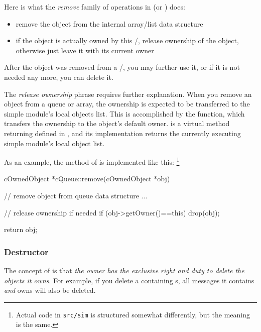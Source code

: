 Here is what the \textit{remove} family of operations in 
(or ) does:

\begin{itemize}
    \item{remove the object from the internal array/list data structure}

    \item{if the object is actually owned by this /,
    release ownership of the object, otherwise just leave it with
    its current owner}
\end{itemize}

After the object was removed from a /,
you may further use it, or if it is not needed any more, you can delete it.

The \textit{release ownership} phrase requires further explanation.
When you remove an object from a queue or array, the ownership
is expected to be transferred to the simple module's local objects list.
This is accomplished by the  function, which transfers the
ownership to the object's default owner.
 is a virtual method returning 
defined in , and its implementation returns
the currently executing simple module's local object list.

As an example, the  method of  is
implemented like this:
  \footnote{Actual code in \texttt{src/sim} is structured somewhat
  differently, but the meaning is the same.}

\begin{cpp}
cOwnedObject *cQueue::remove(cOwnedObject *obj)
{
    // remove object from queue data structure
    ...

    // release ownership if needed
    if (obj->getOwner()==this)
        drop(obj);

    return obj;
}
\end{cpp}


\subsubsection{Destructor}

The concept of  is that \textit{the owner has the
exclusive right and duty to delete the objects it owns}.
For example, if you delete a  containing s,
all messages it contains \textit{and} owns will also be deleted.

